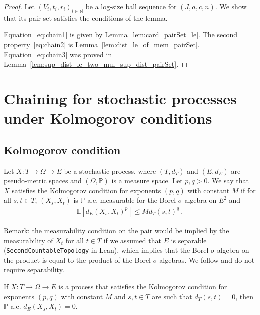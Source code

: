 \begin{proof}\leanok
Let $(V_i, t_i, r_i)_{i \in \mathbb{N}}$ be a log-size ball sequence for $(J, a, c, n)$. We show that its pair set satisfies the conditions of the lemma.

Equation~\eqref{eq:chain1} is given by Lemma~\ref{lem:card_pairSet_le}.
The second property~\eqref{eq:chain2} is Lemma~\ref{lem:dist_le_of_mem_pairSet}.
Equation~\eqref{eq:chain3} was proved in Lemma~\ref{lem:sup_dist_le_two_mul_sup_dist_pairSet}.
\end{proof}





\section{Chaining for stochastic processes under Kolmogorov conditions}

\subsection{Kolmogorov condition}

\begin{definition}\label{def:IsKolmogorovProcess}
  \mathlibok
Let $X : T \to \Omega \to E$ be a stochastic process, where $(T, d_T)$ and $(E, d_E)$ are pseudo-metric spaces and $(\Omega, \mathbb{P})$ is a measure space.
Let $p, q > 0$.
We say that $X$ satisfies the Kolmogorov condition for exponents $(p,q)$ with constant $M$ if for all $s, t \in T$, $(X_s, X_t)$ is $\mathbb{P}$-a.e. measurable for the Borel $\sigma$-algebra on $E^2$ and
\begin{align*}
  \mathbb{E}[d_E(X_s, X_t)^p] \le M d_T(s, t)^q
  \: .
\end{align*}
\end{definition}

Remark: the measurability condition on the pair would be implied by the measurability of $X_t$ for all $t \in T$ if we assumed that $E$ is separable (\texttt{SecondCountableTopology} in Lean), which implies that the Borel $\sigma$-algebra on the product is equal to the product of the Borel $\sigma$-algebras.
We follow \cite{kratschmer2023kolmogorov} and do not require separability.


\begin{lemma}\label{lem:IsKolmogorovProcess.edist_eq_zero}
  \mathlibok
If $X : T \to \Omega \to E$ is a process that satisfies the Kolmogorov condition for exponents $(p,q)$ with constant $M$ and $s, t \in T$ are such that $d_T(s, t) = 0$, then $\mathbb{P}$-a.e. $d_E(X_s, X_t) = 0$.
\end{lemma}

